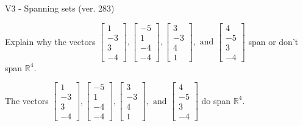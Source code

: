 \begin{exercise}
  \begin{exerciseTitle}V3 - Spanning sets (ver. 283)\end{exerciseTitle}
  \begin{exerciseStatement}
    Explain why the vectors \(\left[\begin{array}{r}
1 \\
-3 \\
3 \\
-4
\end{array}\right] , \left[\begin{array}{r}
-5 \\
1 \\
-4 \\
-4
\end{array}\right] , \left[\begin{array}{r}
3 \\
-3 \\
4 \\
1
\end{array}\right] , \text{ and } \left[\begin{array}{r}
4 \\
-5 \\
3 \\
-4
\end{array}\right]\) span or don't span \(\mathbb{R}^4\). 
	


  \end{exerciseStatement}
  \begin{exerciseAnswer}
   The vectors \(\left[\begin{array}{r}
1 \\
-3 \\
3 \\
-4
\end{array}\right] , \left[\begin{array}{r}
-5 \\
1 \\
-4 \\
-4
\end{array}\right] , \left[\begin{array}{r}
3 \\
-3 \\
4 \\
1
\end{array}\right] , \text{ and } \left[\begin{array}{r}
4 \\
-5 \\
3 \\
-4
\end{array}\right]\) 
  	 do  
	span \(\mathbb{R}^4\).
  


  \end{exerciseAnswer}
\end{exercise}